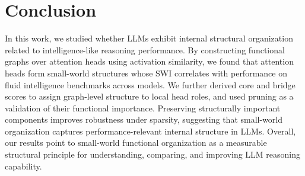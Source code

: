 \section{Conclusion}

In this work, we studied whether LLMs exhibit internal structural organization related to intelligence-like reasoning performance. By constructing functional graphs over attention heads using activation similarity, we found that attention heads form small-world structures whose SWI correlates with performance on fluid intelligence benchmarks across models. We further derived core and bridge scores to assign graph-level structure to local head roles, and used pruning as a validation of their functional importance. Preserving structurally important components improves robustness under sparsity, suggesting that small-world organization captures performance-relevant internal structure in LLMs. Overall, our results point to small-world functional organization as a measurable structural principle for understanding, comparing, and improving LLM reasoning capability.
